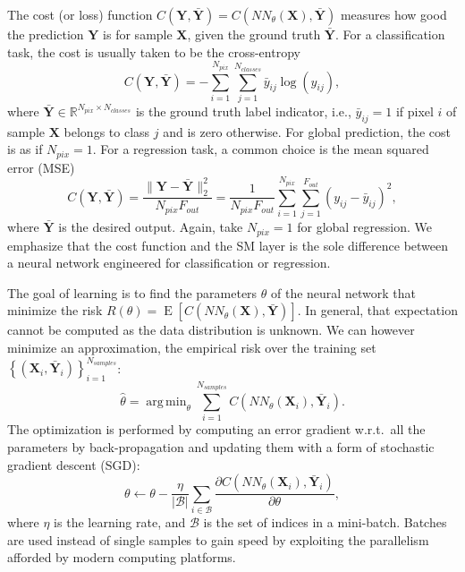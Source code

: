 \documentclass[final,twocolumn,3p,times,sort&compress]{elsarticle}
\renewcommand{\b}[1]{{\bm{#1}}}   %
\newcommand{\1}{\b{1}}              %
\newcommand{\0}{\b{0}}              %
\newcommand{\B}{\mathcal{B}}
\newcommand{\X}{\b{X}}
\newcommand{\Y}{\b{Y}}
\newcommand{\R}{\mathbb{R}}
\DeclareMathOperator*{\esp}{E}
\DeclareMathOperator*{\argmin}{arg \, min}
\begin{document}
The cost (or loss) function $C(\Y, \bar \Y) = C(NN_\theta(\X), \bar \Y)$ measures how good the prediction $\Y$ is for sample $\X$, given the ground truth $\bar \Y$. For a classification task, the cost is usually taken to be the cross-entropy
\begin{equation*}
	C(\Y, \bar \Y) = - \sum_{i=1}^{N_{pix}} \sum_{j=1}^{N_{classes}} \bar y_{ij} \log(y_{ij}),
\end{equation*}
where $\bar \Y \in \R^{N_{pix} \times N_{classes}}$ is the ground truth label indicator, i.e., $\bar y_{ij} = 1$ if pixel $i$ of sample $\X$ belongs to class $j$ and is zero otherwise. For global prediction, the cost is as if $N_{pix} = 1$.
For a regression task, a common choice is the mean squared error (MSE)
\begin{equation*}
	C(\Y, \bar \Y) = \frac{\|\Y-\bar{\Y}\|_2^2}{N_{pix} F_{out}} = \frac{1}{N_{pix} F_{out}} \sum_{i=1}^{N_{pix}} \sum_{j=1}^{F_{out}} (y_{ij} - \bar y_{ij})^2,
\end{equation*}
where $\bar{\Y}$ is the desired output. Again, take $N_{pix} = 1$ for global regression. We emphasize that the cost function and the SM layer is the sole difference between a neural network engineered for classification or regression.

The goal of learning is to find the parameters $\theta$ of the neural network that minimize the risk $R(\theta) = \esp \left[ C \left( NN_\theta(\X), \bar \Y \right) \right]$. In general, that expectation cannot be computed as the data distribution is unknown. We can however minimize an approximation, the empirical risk over the training set $\left\{ \left( \X_i, \bar \Y_i \right) \right\}_{i=1}^{N_{samples}}$:
\begin{equation*}
	\hat{\theta} = \argmin_\theta \sum_{i=1}^{N_{samples}} C \left(NN_\theta(\X_i), \bar \Y_i \right).
\end{equation*}
The optimization is performed by computing an error gradient w.r.t.\ all the parameters by back-propagation and updating them with a form of stochastic gradient descent (SGD):
\begin{equation*}
	\theta \leftarrow \theta - \frac{\eta}{|\B|} \sum_{i \in \B} \frac{\partial C \left( NN_\theta(\X_i), \bar \Y_i \right)}{\partial \theta} ,
\end{equation*}
where $\eta$ is the learning rate, and $\B$ is the set of indices in a mini-batch. Batches are used instead of single samples to gain speed by exploiting the parallelism afforded by modern computing platforms.
\end{document}
